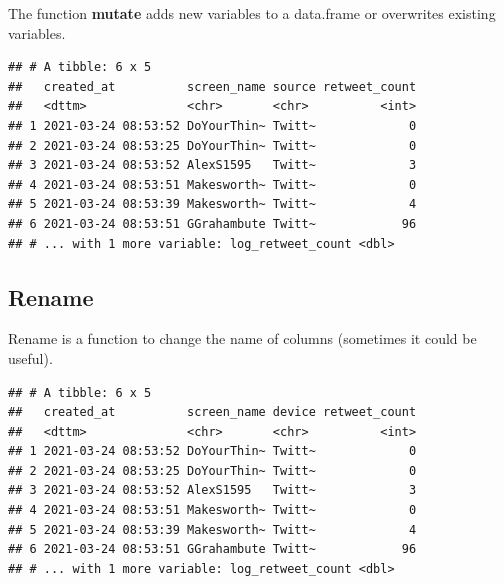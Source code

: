 \documentclass[
]{article}
\newenvironment{Shaded}{\begin{snugshade}}{\end{snugshade}}
\newcommand{\CommentTok}[1]{\textcolor[rgb]{0.56,0.35,0.01}{\textit{#1}}}
\newcommand{\DataTypeTok}[1]{\textcolor[rgb]{0.13,0.29,0.53}{#1}}
\newcommand{\KeywordTok}[1]{\textcolor[rgb]{0.13,0.29,0.53}{\textbf{#1}}}
\newcommand{\NormalTok}[1]{#1}
\newcommand{\OperatorTok}[1]{\textcolor[rgb]{0.81,0.36,0.00}{\textbf{#1}}}
\newcommand{\StringTok}[1]{\textcolor[rgb]{0.31,0.60,0.02}{#1}}
\begin{document}
The function \textbf{mutate} adds new variables to a data.frame or overwrites existing variables.

\begin{Shaded}
\end{Shaded}

\begin{verbatim}
## # A tibble: 6 x 5
##   created_at          screen_name source retweet_count
##   <dttm>              <chr>       <chr>          <int>
## 1 2021-03-24 08:53:52 DoYourThin~ Twitt~             0
## 2 2021-03-24 08:53:25 DoYourThin~ Twitt~             0
## 3 2021-03-24 08:53:52 AlexS1595   Twitt~             3
## 4 2021-03-24 08:53:51 Makesworth~ Twitt~             0
## 5 2021-03-24 08:53:39 Makesworth~ Twitt~             4
## 6 2021-03-24 08:53:51 GGrahambute Twitt~            96
## # ... with 1 more variable: log_retweet_count <dbl>
\end{verbatim}

\hypertarget{rename}{%
\subsection{Rename}\label{rename}}

Rename is a function to change the name of columns (sometimes it could be useful).

\begin{Shaded}
\end{Shaded}

\begin{verbatim}
## # A tibble: 6 x 5
##   created_at          screen_name device retweet_count
##   <dttm>              <chr>       <chr>          <int>
## 1 2021-03-24 08:53:52 DoYourThin~ Twitt~             0
## 2 2021-03-24 08:53:25 DoYourThin~ Twitt~             0
## 3 2021-03-24 08:53:52 AlexS1595   Twitt~             3
## 4 2021-03-24 08:53:51 Makesworth~ Twitt~             0
## 5 2021-03-24 08:53:39 Makesworth~ Twitt~             4
## 6 2021-03-24 08:53:51 GGrahambute Twitt~            96
## # ... with 1 more variable: log_retweet_count <dbl>
\end{verbatim}
\end{document}
